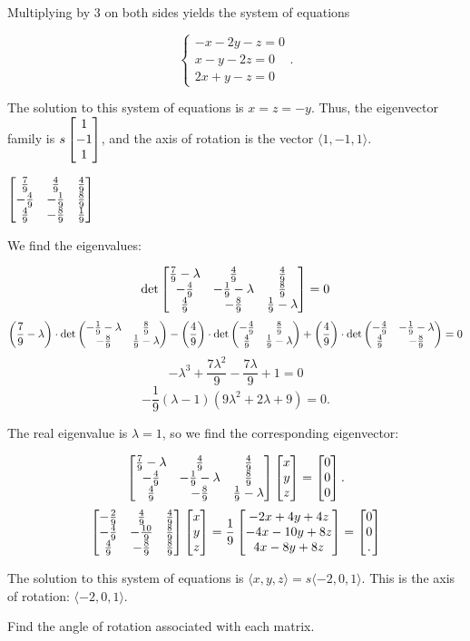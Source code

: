 \documentclass[../gatm_answers.tex]{subfiles}
\begin{document}
{{Multiplying by $3$ on both sides yields the system of equations

$$\begin{cases} -x -2y -z = 0 \\x-y-2z = 0 \\ 2x + y - z = 0 \end{cases}.$$

The solution to this system of equations is $x=z=-y$. Thus, the eigenvector family is $s\begin{bmatrix} 1 \\ -1 \\ 1 \end{bmatrix}$, and the axis of rotation is the vector $\langle 1, -1, 1\rangle$.

\begin{iinner_problem}[start=1]
\item $\begin{bmatrix} \frac{7}{9} & \frac{4}{9} & \frac{4}{9} \\ -\frac{4}{9} & -\frac{1}{9} & \frac{8}{9} \\ \frac{4}{9} & -\frac{8}{9} & \frac{1}{9} \end{bmatrix}$
\end{iinner_problem}

We find the eigenvalues:

$$\det \begin{bmatrix} \frac{7}{9}-\lambda & \frac{4}{9} & \frac{4}{9} \\ -\frac{4}{9} & -\frac{1}{9}-\lambda & \frac{8}{9} \\ \frac{4}{9} & -\frac{8}{9} & \frac{1}{9}-\lambda \end{bmatrix} = 0$$
$$\left(\frac{7}{9}-\lambda\right) \cdot \det \begin{pmatrix} -\frac{1}{9}-\lambda & \frac{8}{9} \\ -\frac{8}{9} & \frac{1}{9}-\lambda \end{pmatrix} - \left(\frac{4}{9}\right) \cdot \det \begin{pmatrix} -\frac{4}{9} & \frac{8}{9} \\ \frac{4}{9} & \frac{1}{9}-\lambda \end{pmatrix} + \left(\frac{4}{9}\right) \cdot \det \begin{pmatrix} -\frac{4}{9} & -\frac{1}{9}-\lambda \\ \frac{4}{9} & -\frac{8}{9} \end{pmatrix} = 0$$
$$-\lambda^3 + \frac{7 \lambda^2}{9} - \frac{7 \lambda}{9} + 1=0$$
$$-\frac{1}{9} (\lambda - 1) (9 \lambda^2 + 2 \lambda + 9) = 0.$$

The real eigenvalue is $\lambda = 1$, so we find the corresponding eigenvector:

$$\begin{bmatrix} \frac{7}{9}-\lambda & \frac{4}{9} & \frac{4}{9} \\ -\frac{4}{9} & -\frac{1}{9}-\lambda & \frac{8}{9} \\ \frac{4}{9} & -\frac{8}{9} & \frac{1}{9}-\lambda \end{bmatrix}\begin{bmatrix} x \\ y \\ z \end{bmatrix} = \begin{bmatrix} 0 \\ 0 \\ 0 \end{bmatrix}.$$
$$\begin{bmatrix} -\frac{2}{9} & \frac{4}{9} & \frac{4}{9} \\ -\frac{4}{9} & -\frac{10}{9} & \frac{8}{9} \\ \frac{4}{9} & -\frac{8}{9} & \frac{8}{9} \end{bmatrix}\begin{bmatrix} x \\ y \\ z \end{bmatrix} = \frac{1}{9} \begin{bmatrix} -2x+4y+4z \\ -4x-10y+8z \\ 4x-8y+8z \end{bmatrix} = \begin{bmatrix} 0 \\ 0 \\ . \end{bmatrix}$$

The solution to this system of equations is $\langle x,y,z\rangle = s\langle -2, 0, 1\rangle$. This is the axis of rotation: $\langle -2,0,1\rangle$.

\begin{inner_problem}
\item Find the angle of rotation associated with each matrix.
\end{inner_problem}

}}
\end{document}

